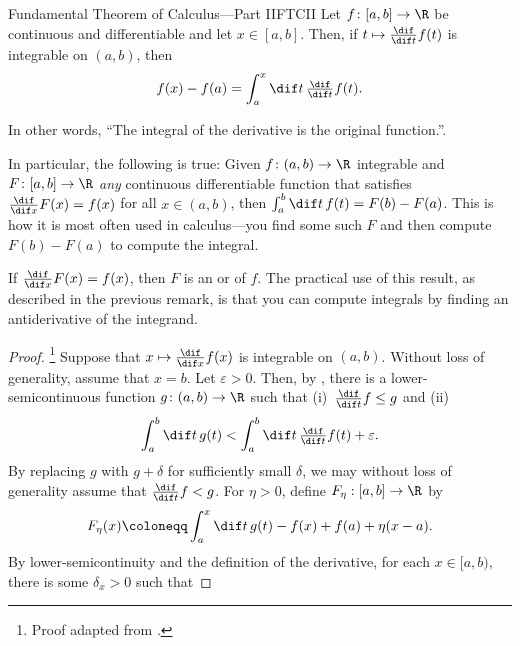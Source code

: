\begin{thm}{Fundamental Theorem of Calculus---Part II}{FTCII}
Let $f\colon [a,b]\rightarrow \R$ be continuous and differentiable and let $x\in [a,b]$.  Then, if $t\mapsto \frac{\dif}{\dif t}f(t)$ is integrable on $(a,b)$, then
\begin{equation}
f(x)-f(a)=\int _a^x\dif t\, \tfrac{\dif}{\dif t}f(t).
\end{equation}
\begin{rmk}
In other words, ``The integral of the derivative is the original function.''.
\end{rmk}
\begin{rmk}
In particular, the following is true:  Given $f\colon (a,b)\rightarrow \R$ integrable and $F\colon [a,b]\rightarrow \R$ \emph{any} continuous differentiable function that satisfies $\frac{\dif}{\dif x}F(x)=f(x)$ for all $x\in (a,b)$, then $\int _a^b\dif t\, f(t)=F(b)-F(a)$.  This is how it is most often used in calculus---you find some such $F$ and then compute $F(b)-F(a)$ to compute the integral.
\end{rmk}
\begin{rmk}
If $\frac{\dif}{\dif x}F(x)=f(x)$, then $F$ is an  or  of $f$.  The practical use of this result, as described in the previous remark, is that you can compute integrals by finding an antiderivative of the integrand.
\end{rmk}
\begin{proof}\footnote{Proof adapted from \cite[pg.~149]{BigRudin}.}
Suppose that $x\mapsto \frac{\dif}{\dif x}f(x)$ is integrable on $(a,b)$.  Without loss of generality, assume that $x=b$.  Let $\varepsilon >0$.  Then, by , there is a lower-semicontinuous function $g\colon (a,b)\rightarrow \R$ such that (i)~$\frac{\dif}{\dif t}f\leq g$ and (ii)
\begin{equation}
\int _a^b\dif t\, g(t)<\int _a^b\dif t\, \tfrac{\dif}{\dif t}f(t)+\varepsilon .
\end{equation}
By replacing $g$ with $g+\delta$ for sufficiently small $\delta$, we may without loss of generality assume that $\frac{\dif}{\dif t}f<g$.  For $\eta >0$, define $F_\eta :[a,b]\rightarrow \R$ by
\begin{equation}\label{Rudin3}
F_\eta (x)\coloneqq \int _a^x\dif t\, g(t)-f(x)+f(a)+\eta (x-a).
\end{equation}
By lower-semicontinuity and the definition of the derivative, for each $x\in [a,b)$, there is some $\delta _x>0$ such that

\end{proof}
\end{thm}
